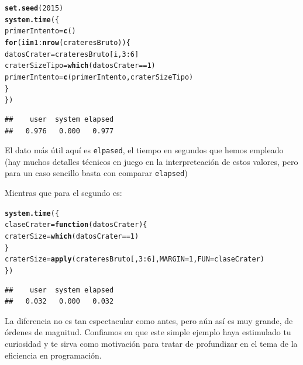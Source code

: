 \documentclass[10pt,a4paper]{article}\usepackage[]{graphicx}\usepackage[]{color}
\makeatletter
\newcommand{\hlnum}[1]{\textcolor[rgb]{0.686,0.059,0.569}{#1}}%
\newcommand{\hlopt}[1]{\textcolor[rgb]{0,0,0}{#1}}%
\newcommand{\hlstd}[1]{\textcolor[rgb]{0.345,0.345,0.345}{#1}}%
\newcommand{\hlkwa}[1]{\textcolor[rgb]{0.161,0.373,0.58}{\textbf{#1}}}%
\newcommand{\hlkwb}[1]{\textcolor[rgb]{0.69,0.353,0.396}{#1}}%
\newcommand{\hlkwc}[1]{\textcolor[rgb]{0.333,0.667,0.333}{#1}}%
\newcommand{\hlkwd}[1]{\textcolor[rgb]{0.737,0.353,0.396}{\textbf{#1}}}%
\newenvironment{kframe}{%
 \def\at@end@of@kframe{}%
 \ifinner\ifhmode%
  \def\at@end@of@kframe{\end{minipage}}%
  \begin{minipage}{\columnwidth}%
 \fi\fi%
 \def\FrameCommand##1{\hskip\@totalleftmargin \hskip-\fboxsep
 \colorbox{shadecolor}{##1}\hskip-\fboxsep
     \hskip-\linewidth \hskip-\@totalleftmargin \hskip\columnwidth}%
 \MakeFramed {\advance\hsize-\width
   \@totalleftmargin\z@ \linewidth\hsize
   \@setminipage}}%
 {\par\unskip\endMakeFramed%
 \at@end@of@kframe}
\newenvironment{knitrout}{}{} %
\makeatother
\begin{document}
\begin{knitrout}
\color{fgcolor}\begin{kframe}
\begin{alltt}
\hlkwd{set.seed}\hlstd{(}\hlnum{2015}\hlstd{)}
\hlkwd{system.time}\hlstd{(\{}
  \hlstd{primerIntento} \hlkwb{=} \hlkwd{c}\hlstd{()}
  \hlkwa{for}\hlstd{(i} \hlkwa{in} \hlnum{1}\hlopt{:}\hlkwd{nrow}\hlstd{(crateresBruto))\{}
    \hlstd{datosCrater} \hlkwb{=} \hlstd{crateresBruto[i,} \hlnum{3}\hlopt{:}\hlnum{6}\hlstd{]}
    \hlstd{craterSizeTipo} \hlkwb{=} \hlkwd{which}\hlstd{(datosCrater} \hlopt{==} \hlnum{1}\hlstd{)}
    \hlstd{primerIntento} \hlkwb{=} \hlkwd{c}\hlstd{(primerIntento, craterSizeTipo)}
  \hlstd{\}}
\hlstd{\})}
\end{alltt}
\begin{verbatim}
##    user  system elapsed 
##   0.976   0.000   0.977
\end{verbatim}
\end{kframe}
\end{knitrout}
El dato más útil aquí es {\tt elpased}, el tiempo en segundos que hemos empleado (hay muchos detalles técnicos en juego en la interpreteación de estos valores, pero para un caso sencillo basta con comparar {\tt elapsed})

Mientras que para el segundo es:
\begin{knitrout}
\color{fgcolor}\begin{kframe}
\begin{alltt}
\hlkwd{system.time}\hlstd{(\{}
  \hlstd{claseCrater} \hlkwb{=} \hlkwa{function}\hlstd{(}\hlkwc{datosCrater}\hlstd{)\{}
    \hlstd{craterSize} \hlkwb{=} \hlkwd{which}\hlstd{(datosCrater} \hlopt{==} \hlnum{1}\hlstd{)}
  \hlstd{\}}
\hlstd{craterSize} \hlkwb{=} \hlkwd{apply}\hlstd{(crateresBruto[,} \hlnum{3}\hlopt{:}\hlnum{6}\hlstd{],} \hlkwc{MARGIN} \hlstd{=} \hlnum{1}\hlstd{,} \hlkwc{FUN} \hlstd{= claseCrater)}
\hlstd{\})}
\end{alltt}
\begin{verbatim}
##    user  system elapsed 
##   0.032   0.000   0.032
\end{verbatim}
\end{kframe}
\end{knitrout}
La diferencia no es tan espectacular como antes, pero aún así es muy grande, de órdenes de magnitud. Confiamos en que este simple ejemplo haya estimulado tu curiosidad y te sirva como motivación para tratar de profundizar en el tema de la eficiencia en programación.
\end{document}
